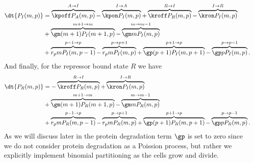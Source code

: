 \begin{equation}
  \begin{aligned}
    \dt{P_I(m, p)} &=
    \overbrace{\kpoff P_A(m, p)}^{A \rightarrow I} %
    - \overbrace{\kpon P_I(m, p)}^{I \rightarrow A} %
    + \overbrace{\kroff P_R(m, p)}^{R \rightarrow I} %
    - \overbrace{\kron P_I(m, p)}^{I \rightarrow R}\\ %
    &+ \overbrace{\gm (m + 1) P_I(m+1 , p)}^{m+1 \rightarrow m} %
    - \overbrace{\gm m P_I(m , p)}^{m \rightarrow m-1}\\ %
    &+ \overbrace{r_p m P_I(m, p - 1)}^{p-1 \rightarrow p} %
    - \overbrace{r_p m P_I(m, p)}^{p \rightarrow p+1} %
    + \overbrace{\gp (p + 1) P_I(m, p + 1)}^{p + 1 \rightarrow p} %
    - \overbrace{\gp p P_I(m, p)}^{p \rightarrow p-1}. %
  \end{aligned}
\end{equation}
And finally, for the repressor bound state $R$ we have
\begin{equation}
  \begin{aligned}
    \dt{P_R(m, p)} &=
    - \overbrace{\kroff P_R(m, p)}^{R \rightarrow I} %
    + \overbrace{\kron P_I(m, p)}^{I \rightarrow R}\\ %
    &+ \overbrace{\gm (m + 1) P_R(m+1 , p)}^{m+1 \rightarrow m} %
    - \overbrace{\gm m P_R(m , p)}^{m \rightarrow m-1}\\ %
    &+ \overbrace{r_p m P_R(m, p - 1)}^{p-1 \rightarrow p} %
    - \overbrace{r_p m P_R(m, p)}^{p \rightarrow p+1} %
    + \overbrace{\gp (p + 1) P_R(m, p + 1)}^{p + 1 \rightarrow p} %
    - \overbrace{\gp p P_R(m, p)}^{p \rightarrow p-1}. %
  \end{aligned}
\end{equation}
As we will discuss later in  the protein degradation term
$\gp$ is set to zero since we do not consider protein degradation as a Poission
process, but rather we explicitly implement binomial partitioning as the cells
grow and divide.

